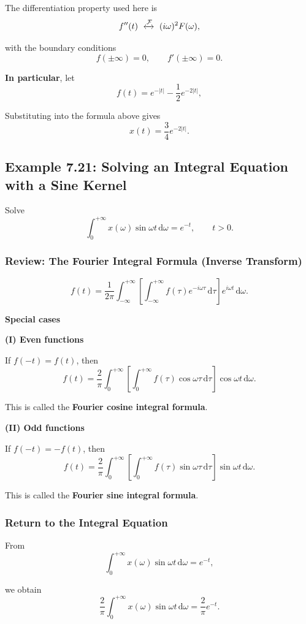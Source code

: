 \documentclass[11pt,a4paper]{article}
\theoremstyle{definition}
\theoremstyle{plain}
\begin{document}
The differentiation property used here is
\[
f''(t)\ \xleftrightarrow{\mathcal F}\
(i\omega)^2F(\omega),
\]

with the boundary conditions
\[
f(\pm\infty)=0,
\qquad
f'(\pm\infty)=0.
\]

\textbf{In particular}, let
\[
f(t)=e^{-|t|}-\frac12e^{-2|t|},
\]

Substituting into the formula above gives
\[
x(t)=\frac34e^{-2|t|}.
\]

\subsection{Example 7.21: Solving an Integral Equation with a Sine Kernel}

Solve
\[
\int_0^{+\infty}x(\omega)\sin\omega t\,\mathrm d\omega
=e^{-t},
\qquad t>0.
\]

\subsubsection*{Review: The Fourier Integral Formula (Inverse Transform)}
\[
f(t)=\frac1{2\pi}
\int_{-\infty}^{+\infty}
\left[
\int_{-\infty}^{+\infty}
f(\tau)e^{-i\omega\tau}\,\mathrm d\tau
\right]e^{i\omega t}\,\mathrm d\omega.
\]

\textbf{Special cases}

\textbf{(I) Even functions}

If \(f(-t)=f(t)\), then
\[
f(t)=\frac2\pi
\int_0^{+\infty}
\left[
\int_0^{+\infty}
f(\tau)\cos\omega\tau\,\mathrm d\tau
\right]\cos\omega t\,\mathrm d\omega.
\]

This is called the \textbf{Fourier cosine integral formula}.

\textbf{(II) Odd functions}

If \(f(-t)=-f(t)\), then
\[
f(t)=\frac2\pi
\int_0^{+\infty}
\left[
\int_0^{+\infty}
f(\tau)\sin\omega\tau\,\mathrm d\tau
\right]\sin\omega t\,\mathrm d\omega.
\]

This is called the \textbf{Fourier sine integral formula}.

\subsubsection*{Return to the Integral Equation}

From
\[
\int_0^{+\infty}x(\omega)\sin\omega t\,\mathrm d\omega=e^{-t},
\]

we obtain
\[
\frac2\pi\int_0^{+\infty}
x(\omega)\sin\omega t\,\mathrm d\omega
=\frac2\pi e^{-t}.
\]
\end{document}
